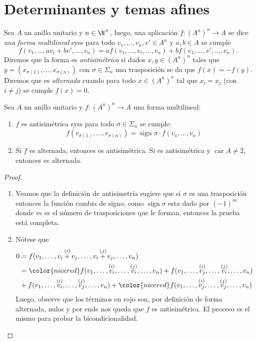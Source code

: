 \documentclass[11pt,oneside]{book}
\DeclareMathOperator{\sign}{sign}
\DeclareMathOperator{\car}{car}
\begin{document}
\section{Determinantes y temas afines}
\begin{mydef}
Sea $A$ un anillo unitario y $n\in\N^+$, luego, una aplicación $f:(A^n)^n\rightarrow A$ se dice \textit{una forma multilineal} syss para todo $v_1,\dots,v_n,v'\in A^n$ y $a,b\in A$ se cumple
$$f(v_1,\dots,av_i+bv',\dots,v_n)=af(v_1,\dots,v_i,\dots,v_n)+bf(v_1,\dots,v',\dots,v_n).$$
Diremos que la forma es \textit{antisimétrica} si dados $x,y\in(A^n)^n$ tales que $y=(x_{\sigma(1)},\dots,x_{\sigma(n)})$ con $\sigma\in\Sigma_n$ una trasposición se da que $f(x)=-f(y)$. Diremos que es \textit{alternada} cuando para todo $x\in(A^n)^n$ tal que $x_i=x_j$ (con $i\neq j$) se cumple $f(x)=0$.
\end{mydef}
\begin{thm}
Sea $A$ un anillo unitario y $f:(A^n)^n\rightarrow A$ una forma multilineal:
	\begin{enumerate}[$a)$]
	\item $f$ es antisimétrica syss para todo $\sigma\in\Sigma_n$ se cumple:
	$$f(v_{\sigma(1)},\dots,v_{\sigma(n)})=\sign\sigma\cdot f(v_1,\dots,v_n)$$
	\item Si $f$ es alternada, entonces es antisimétrica. Si es antisimétrica y $\car A\neq 2$, entonces es alternada.
	\end{enumerate}
\end{thm}
\begin{proof}
	\begin{enumerate}[$a)$]
	\item Veamos que la definición de antisimetría sugiere que si $\sigma$ es una trasposición entonces la función cambia de signo, como $\sign\sigma$ esta dado por $(-1)^m$ donde $m$ es el número de trasposiciones que le forman, entonces la prueba está completa.
	\item Nótese que
	\begin{align*}
	0&=f(v_1,\dots,\overset{(i)}{v_i+v_j},\dots,\overset{(j)}{v_i+v_j},\dots,v_n)\\
	&={\color{nicered}f(v_1,\dots,\overset{(i)}{v_i},\dots,\overset{(j)}{v_i},\dots,v_n)}+f(v_1,\dots,\overset{(i)}{v_j},\dots,\overset{(j)}{v_i},\dots,v_n)\\
	&{}+f(v_1,\dots,\overset{(i)}{v_i},\dots,\overset{(j)}{v_j},\dots,v_n)+{\color{nicered}f(v_1,\dots,\overset{(i)}{v_j},\dots,\overset{(j)}{v_j},\dots,v_n)}
	\end{align*}
	Luego, observe que los términos en rojo son, por definición de forma alternada, nulos y por ende nos queda que $f$ es antisimétrica. El proceso es el mismo para probar la bicondicionalidad.
	\end{enumerate}
\end{proof}
\end{document}
